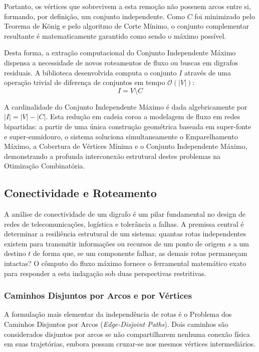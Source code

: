 \documentclass[12pt,a4paper]{article}
\begin{document}
Portanto, os vértices que sobrevivem a esta remoção não possuem arcos entre si, formando, por definição, um conjunto independente. Como $C$ foi minimizado pelo Teorema de König e pelo algoritmo de Corte Mínimo, o conjunto complementar resultante é matematicamente garantido como sendo o máximo possível.

Desta forma, a extração computacional do Conjunto Independente Máximo dispensa a necessidade de novos roteamentos de fluxo ou buscas em digrafos residuais. A biblioteca desenvolvida computa o conjunto $I$ através de uma operação trivial de diferença de conjuntos em tempo $\mathcal{O}(|V|)$:
\begin{equation}
    I = V \setminus C
\end{equation}

A cardinalidade do Conjunto Independente Máximo é dada algebricamente por $|I| = |V| - |C|$. Esta redução em cadeia coroa a modelagem de fluxo em redes bipartidas: a partir de uma única construção geométrica baseada em super-fonte e super-sumidouro, o sistema soluciona simultaneamente o Emparelhamento Máximo, a Cobertura de Vértices Mínima e o Conjunto Independente Máximo, demonstrando a profunda interconexão estrutural destes problemas na Otimização Combinatória.

\subsection{Conectividade e Roteamento}

A análise de conectividade de um digrafo é um pilar fundamental no design de redes de telecomunicações, logística e tolerância a falhas. A premissa central é determinar a resiliência estrutural de um sistema: quantas rotas independentes existem para transmitir informações ou recursos de um ponto de origem $s$ a um destino $t$ de forma que, se um componente falhar, as demais rotas permaneçam intactas? O cômputo do fluxo máximo fornece o ferramental matemático exato para responder a esta indagação sob duas perspectivas restritivas.

\subsubsection{Caminhos Disjuntos por Arcos e por Vértices}

A formulação mais elementar da independência de rotas é o Problema dos Caminhos Disjuntos por Arcos (\textit{Edge-Disjoint Paths}). Dois caminhos são considerados disjuntos por arcos se não compartilharem nenhuma conexão física em suas trajetórias, embora possam cruzar-se nos mesmos vértices intermediários.
\end{document}
